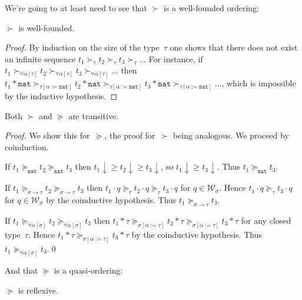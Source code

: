 \documentclass[runningheads,a4paper]{llncs}
\newcommand{\World}{\mathcal{W}}
\newcommand{\app}[2]{#1 \cdot #2}
\newcommand{\tapp}[2]{#1 * #2}
\newcommand{\subst}[2]{#1:=#2}
\newcommand{\nat}{\mathtt{nat}}
\newcommand{\da}{\downarrow}
\begin{document}
We're going to at least need to see that $\succ$ is a well-founded ordering:

\begin{lemma}
$\succ$ is well-founded.
\end{lemma}

\begin{proof}
  By induction on the size of the type~$\tau$ one shows that there does
  not exist an infinite sequence
  $t_1 \succ_\tau t_2 \succ_\tau t_3 \succ_\tau \ldots$ For instance,
  if
  $t_1 \succ_{\forall\alpha[\tau]} t_2 \succ_{\forall\alpha[\tau]} t_3
  \succ_{\forall\alpha[\tau]} \ldots$ then
  $\tapp{t_1}{\nat} \succ_{\tau[\subst{\alpha}{\nat}]}
  \tapp{t_2}{\nat} \succ_{\tau[\subst{\alpha}{\nat}]} \tapp{t_3}{\nat}
  \succ_{\tau[\subst{\alpha}{\nat}]} \ldots$, which is impossible by
  the inductive hypothesis.
\end{proof}

\begin{lemma}
Both $\succ$ and $\succeq$ are transitive.
\end{lemma}

\begin{proof}
  We show this for~$\succeq$, the proof for~$\succ$ being
  analogous. We proceed by coinduction.

  If $t_1 \succeq_\nat t_2 \succeq_\nat t_3$ then
  $t_1\da \ge t_2\da \ge t_3\da$, so $t_1\da \ge t_3\da$. Thus
  $t_1 \succeq_\nat t_3$.

  If $t_1 \succeq_{\sigma\to\tau}t_2\succeq_{\sigma\to\tau}t_3$ then
  $\app{t_1}{q}\succeq_{\tau}\app{t_2}{q}\succeq_\tau\app{t_3}{q}$ for
  $q \in \World_\sigma$. Hence $\app{t_1}{q}\succeq_\tau\app{t_3}{q}$
  for $q \in \World_\sigma$ by the coinductive hypothesis. Thus
  $t_1\succeq_{\sigma\to\tau} t_3$.

  If $t_1 \succeq_{\forall\alpha[\sigma]}t_2\succeq_{\forall\alpha[\sigma]}t_3$ then
  $\tapp{t_1}{\tau}\succeq_{\sigma[\subst{\alpha}{\tau}]}\tapp{t_2}{\tau}\succeq_{\sigma[\subst{\alpha}{\tau}]}\tapp{t_3}{\tau}$ for
  any closed type~$\tau$. Hence
  $\tapp{t_1}{\tau}\succeq_{\sigma[\subst{\alpha}{\tau}]}\tapp{t_3}{\tau}$
  by the coinductive hypothesis. Thus $t_1\succeq_{\forall\alpha[\sigma]} t_3$.\qed
\end{proof}

And that $\succeq$ is a quasi-ordering:

\begin{lemma}
$\succeq$ is reflexive.
\end{lemma}
\end{document}
